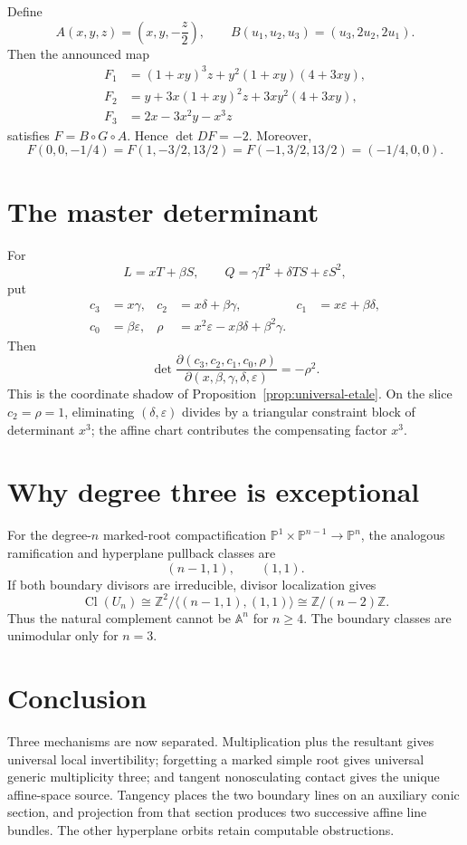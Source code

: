 \documentclass[11pt]{article}
\newcommand{\A}{\mathbb A}
\newcommand{\Pj}{\mathbb P}
\newcommand{\Cl}{\operatorname{Cl}}
\theoremstyle{remark}
\begin{document}
Define
\[
A(x,y,z)=\left(x,y,-\frac z2\right),
\qquad
B(u_1,u_2,u_3)=(u_3,2u_2,2u_1).
\]
Then the announced map
\[
\begin{aligned}
F_1&=(1+xy)^3z+y^2(1+xy)(4+3xy),\\
F_2&=y+3x(1+xy)^2z+3xy^2(4+3xy),\\
F_3&=2x-3x^2y-x^3z
\end{aligned}
\]
satisfies $F=B\circ G\circ A$. Hence $\det DF=-2$. Moreover,
\[
F(0,0,-1/4)=F(1,-3/2,13/2)=F(-1,3/2,13/2)=(-1/4,0,0).
\]

\section{The master determinant}

For
\[
L=xT+\beta S,\qquad Q=\gamma T^2+\delta TS+\varepsilon S^2,
\]
put
\[
\begin{aligned}
c_3&=x\gamma,&c_2&=x\delta+\beta\gamma,
&c_1&=x\varepsilon+\beta\delta,\\
c_0&=\beta\varepsilon,
&\rho&=x^2\varepsilon-x\beta\delta+\beta^2\gamma.
\end{aligned}
\]
Then
\[
\det\frac{\partial(c_3,c_2,c_1,c_0,\rho)}
{\partial(x,\beta,\gamma,\delta,\varepsilon)}=-\rho^2.
\]
This is the coordinate shadow of Proposition~\ref{prop:universal-etale}. On the
slice $c_2=\rho=1$, eliminating $(\delta,\varepsilon)$ divides by a triangular
constraint block of determinant $x^3$; the affine chart contributes the
compensating factor $x^3$.

\section{Why degree three is exceptional}

For the degree-$n$ marked-root compactification
$\Pj^1\times\Pj^{n-1}\to\Pj^n$, the analogous ramification and hyperplane
pullback classes are
\[
(n-1,1),\qquad(1,1).
\]
If both boundary divisors are irreducible, divisor localization gives
\[
\Cl(U_n)\cong
\mathbb Z^2/\langle(n-1,1),(1,1)\rangle
\cong\mathbb Z/(n-2)\mathbb Z.
\]
Thus the natural complement cannot be $\A^n$ for $n\ge4$. The boundary
classes are unimodular only for $n=3$.

\section{Conclusion}

Three mechanisms are now separated. Multiplication plus the resultant gives
universal local invertibility; forgetting a marked simple root gives universal
generic multiplicity three; and tangent nonosculating contact gives the unique
affine-space source. Tangency places the two boundary lines on an auxiliary
conic section, and projection from that section produces two successive affine
line bundles. The other hyperplane orbits retain computable obstructions.
\end{document}
